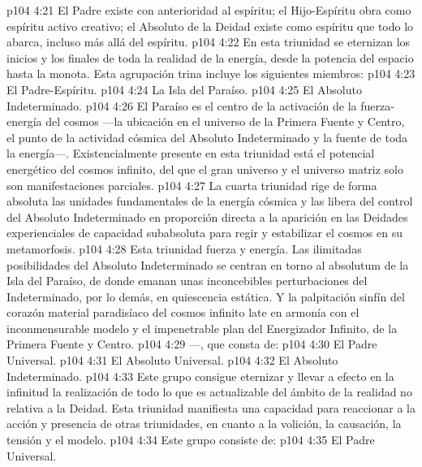 \vs p104 4:21 El Padre existe con anterioridad al espíritu; el Hijo\hyp{}Espíritu obra como espíritu activo creativo; el Absoluto de la Deidad existe como espíritu que todo lo abarca, incluso más allá del espíritu.
\vs p104 4:22 \pc {} En esta triunidad se eternizan los inicios y los finales de toda la realidad de la energía, desde la potencia del espacio hasta la monota. Esta agrupación trina incluye los siguientes miembros:
\vs p104 4:23 El Padre\hyp{}Espíritu.
\vs p104 4:24 La Isla del Paraíso.
\vs p104 4:25 El Absoluto Indeterminado.
\vs p104 4:26 \pc El Paraíso es el centro de la activación de la fuerza\hyp{}energía del cosmos ---la ubicación en el universo de la Primera Fuente y Centro, el punto de la actividad cósmica del Absoluto Indeterminado y la fuente de toda la energía---. Existencialmente presente en esta triunidad está el potencial energético del cosmos infinito, del que el gran universo y el universo matriz solo son manifestaciones parciales.
\vs p104 4:27 La cuarta triunidad rige de forma absoluta las unidades fundamentales de la energía cósmica y las libera del control del Absoluto Indeterminado en proporción directa a la aparición en las Deidades experienciales de capacidad subabsoluta para regir y estabilizar el cosmos en su metamorfosis.
\vs p104 4:28 Esta triunidad  fuerza y energía. Las ilimitadas posibilidades del Absoluto Indeterminado se centran en torno al absolutum de la Isla del Paraíso, de donde emanan unas inconcebibles perturbaciones del Indeterminado, por lo demás, en quiescencia estática. Y la palpitación sinfín del corazón material paradisíaco del cosmos infinito late en armonía con el inconmensurable modelo y el impenetrable plan del Energizador Infinito, de la Primera Fuente y Centro.
\vs p104 4:29 \pc {}---, que consta de:
\vs p104 4:30 El Padre Universal.
\vs p104 4:31 El Absoluto Universal.
\vs p104 4:32 El Absoluto Indeterminado.
\vs p104 4:33 \pc Este grupo consigue eternizar y llevar a efecto en la infinitud la realización de todo lo que es actualizable del ámbito de la realidad no relativa a la Deidad. Esta triunidad manifiesta una capacidad para reaccionar a la acción y presencia de otras triunidades, en cuanto a la volición, la causación, la tensión y el modelo.
\vs p104 4:34 \pc {} Este grupo consiste de:
\vs p104 4:35 El Padre Universal.
